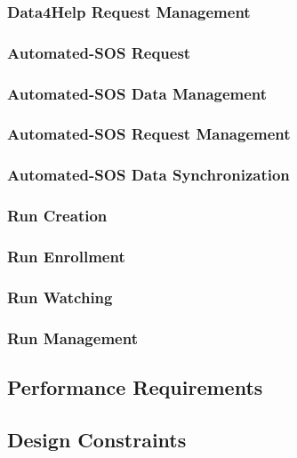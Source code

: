 \documentclass[a4paper]{article}
\begin{document}
        \subsubsection{Data4Help Request Management}
        
        \subsubsection{Automated-SOS Request}
        
        \subsubsection{Automated-SOS Data Management}
        
        \subsubsection{Automated-SOS Request Management}
        
        \subsubsection{Automated-SOS Data Synchronization}
        
        \subsubsection{Run Creation}
        
        \subsubsection{Run Enrollment}
        
        \subsubsection{Run Watching}
        
        \subsubsection{Run Management}
        
    \subsection{Performance Requirements}
    
    \subsection{Design Constraints}
    
\end{document}
